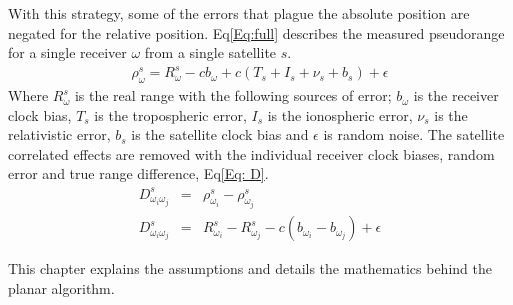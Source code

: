 With this strategy, some of the errors that plague the absolute position are negated for the relative position. Eq\eqref{Eq:full} describes the measured pseudorange for a single receiver $\omega$ from a single satellite $s$.
\begin{eqnarray}
\rho_\omega^s = R_\omega^s -cb_\omega + c(T_s + I_s+\nu_s+b_s) + \epsilon \label{Eq:full}
\end{eqnarray}
Where $R_\omega^s$ is the real range with the following sources of error; $b_\omega$ is the receiver clock bias, $T_s$ is the tropospheric error, $I_s$ is the ionospheric error, $\nu_s$ is the relativistic error, $b_s$ is the satellite clock bias and $\epsilon$ is random noise. The satellite correlated effects are removed with the individual receiver clock biases, random error and true range difference, Eq\eqref{Eq: D}.  
\begin{eqnarray}
D_{\omega_i\omega_j}^s &=& \rho_{\omega_i}^s - \rho_{\omega_j}^s \\
D_{\omega_i\omega_j}^s &=& R_{\omega_i}^s-R_{\omega_j}^s -c(b_{\omega_i}-b_{\omega_j}) + \epsilon \label{Eq: D}
\end{eqnarray}

This chapter explains the assumptions and details the mathematics behind the planar algorithm.












